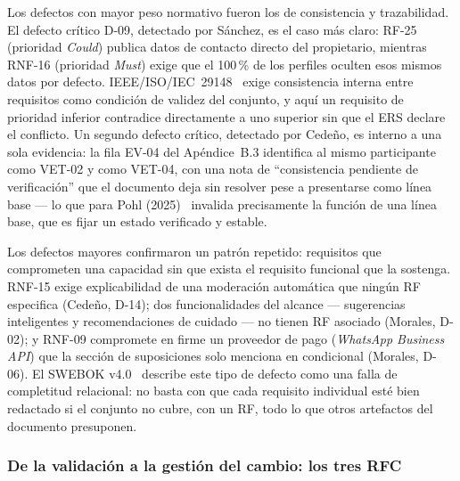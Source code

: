 \documentclass[journal,onecolumn]{IEEEtran}
\begin{document}
	Los defectos con mayor peso normativo fueron los de consistencia y
	trazabilidad. El defecto crítico D-09, detectado por Sánchez, es
	el caso más claro: RF-25 (prioridad \emph{Could}) publica datos de
	contacto directo del propietario, mientras RNF-16 (prioridad
	\emph{Must}) exige que el 100\,\% de los perfiles oculten esos
	mismos datos por defecto. IEEE/ISO/IEC~29148~\cite{ieee29148_2018}
	exige consistencia interna entre requisitos como condición de
	validez del conjunto, y aquí un requisito de prioridad inferior
	contradice directamente a uno superior sin que el ERS declare el
	conflicto. Un segundo defecto crítico, detectado por Cedeño, es
	interno a una sola evidencia: la fila EV-04 del Apéndice~B.3
	identifica al mismo participante como VET-02 y como VET-04, con
	una nota de ``consistencia pendiente de verificación'' que el
	documento deja sin resolver pese a presentarse como línea base ---
	lo que para Pohl (2025)~\cite{pohl2025} invalida precisamente la
	función de una línea base, que es fijar un estado verificado y
	estable.
	
	Los defectos mayores confirmaron un patrón repetido: requisitos
	que comprometen una capacidad sin que exista el requisito
	funcional que la sostenga. RNF-15 exige explicabilidad de una
	moderación automática que ningún RF especifica (Cedeño, D-14); dos
	funcionalidades del alcance --- sugerencias inteligentes y
	recomendaciones de cuidado --- no tienen RF asociado (Morales,
	D-02); y RNF-09 compromete en firme un proveedor de pago
	(\emph{WhatsApp Business API}) que la sección de suposiciones solo
	menciona en condicional (Morales, D-06). El SWEBOK
	v4.0~\cite{swebok2024} describe este tipo de defecto como una
	falla de completitud relacional: no basta con que cada requisito
	individual esté bien redactado si el conjunto no cubre, con un RF,
	todo lo que otros artefactos del documento presuponen.
	
	\subsubsection{De la validación a la gestión del cambio: los tres RFC}
	\label{sec:validacion-a-cambio}
	
\end{document}
